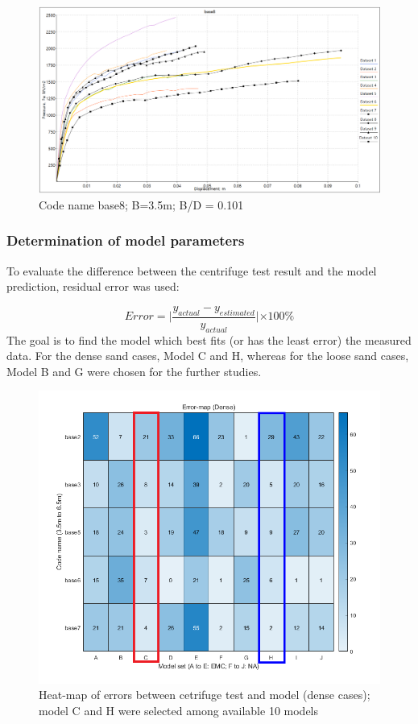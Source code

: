 \documentclass[a4paper, nobind]{templates/ociamthesis}
\begin{document}
\begin{figure}[H]
\includegraphics[width=1\linewidth]{myfigureeeeee/BASE8} \caption{Code name base8; B=3.5m; B/D = 0.101}\label{fig:unnamed-chunk-44}
\end{figure}

\hypertarget{determination-of-model-parameters}{%
\subsubsection{Determination of model parameters}\label{determination-of-model-parameters}}

To evaluate the difference between the centrifuge test result and the model prediction, residual error was used:

\[
Error = \lvert \frac{y_{actual}-y_{estimated}}{y_{actual}}\lvert \times 100\% 
\]
The goal is to find the model which best fits (or has the least error) the measured data.
For the dense sand cases, Model C and H, whereas for the loose sand cases, Model B and G were chosen for the further studies.

\begin{figure}[H]
\includegraphics[width=1\linewidth]{myfigureeeeee/errormap_emc} \caption{Heat-map of errors between cetrifuge test and model (dense cases); model C and H were selected among available 10 models}\label{fig:unnamed-chunk-45}
\end{figure}
\end{document}
